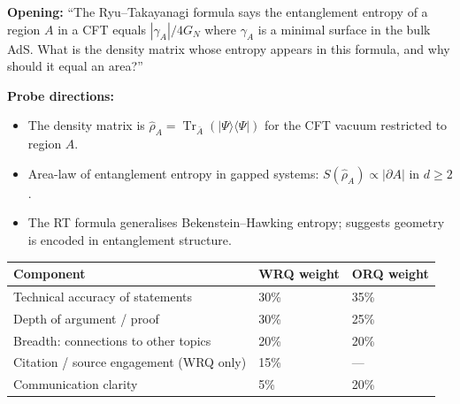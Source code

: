 \documentclass[11pt,a4paper]{article}
\begin{document}
\bigskip

\begin{tcolorbox}[researchbox, title={ORQ 5 --- Entropy and Holography}]

\textbf{Opening:}
``The Ryu--Takayanagi formula says the entanglement entropy of a region $A$
in a CFT equals $|\gamma_A|/4G_N$ where $\gamma_A$ is a minimal surface in
the bulk AdS. What is the density matrix whose entropy appears in this formula,
and why should it equal an area?''

\medskip\textbf{Probe directions:}
\begin{itemize}[leftmargin=1.5em, itemsep=3pt]
  \item The density matrix is $\hat{\rho}_A=\operatorname{Tr}_{\bar{A}}(|\Psi\rangle\langle\Psi|)$
        for the CFT vacuum restricted to region $A$.
  \item Area-law of entanglement entropy in gapped systems:
        $S(\hat{\rho}_A)\propto|\partial A|$ in $d\ge 2$.
  \item The RT formula generalises Bekenstein--Hawking entropy;
        suggests geometry is encoded in entanglement structure.
\end{itemize}
\end{tcolorbox}

\bigskip
\begin{tcolorbox}[rubricbox, title={WRQ / ORQ Assessment Criteria}]
\begin{tabular}{lll}
\toprule
Component & WRQ weight & ORQ weight\\
\midrule
Technical accuracy of statements      & 30\% & 35\%\\
Depth of argument / proof             & 30\% & 25\%\\
Breadth: connections to other topics  & 20\% & 20\%\\
Citation / source engagement (WRQ only) & 15\% & ---\\
Communication clarity                 &  5\% & 20\%\\
\bottomrule
\end{tabular}
\end{tcolorbox}
\end{document}
